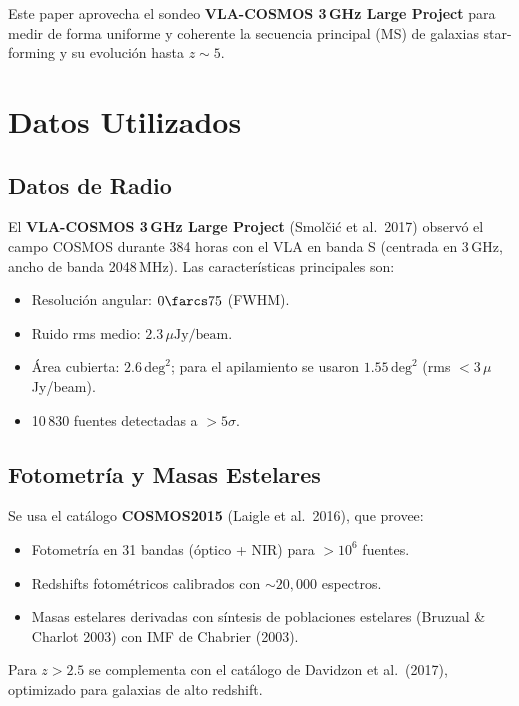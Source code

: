 \documentclass[12pt, a4paper]{article}
\begin{document}
Este paper aprovecha el sondeo \textbf{VLA-COSMOS 3\,GHz Large Project} para
medir de forma uniforme y coherente la secuencia principal (MS) de galaxias
star-forming y su evolución hasta $z \sim 5$.

\section{Datos Utilizados}

\subsection{Datos de Radio}
El \textbf{VLA-COSMOS 3\,GHz Large Project} (Smol\v{c}i\'c et al.\ 2017) observó
el campo COSMOS durante 384 horas con el VLA en banda S (centrada en 3\,GHz,
ancho de banda 2048\,MHz). Las características principales son:

\begin{itemize}[leftmargin=2em]
    \item Resolución angular: $0\farcs75$ (FWHM).
    \item Ruido rms medio: $2.3\,\mu\text{Jy/beam}$.
    \item Área cubierta: $2.6\,\text{deg}^2$; para el apilamiento se usaron
          $1.55\,\text{deg}^2$ (rms $< 3\,\mu$Jy/beam).
    \item 10\,830 fuentes detectadas a $> 5\sigma$.
\end{itemize}

\subsection{Fotometría y Masas Estelares}
Se usa el catálogo \textbf{COSMOS2015} (Laigle et al.\ 2016), que provee:

\begin{itemize}[leftmargin=2em]
    \item Fotometría en 31 bandas (óptico + NIR) para $>10^6$ fuentes.
    \item Redshifts fotométricos calibrados con $\sim20{,}000$ espectros.
    \item Masas estelares derivadas con síntesis de poblaciones estelares
          (Bruzual \& Charlot 2003) con IMF de Chabrier (2003).
\end{itemize}

Para $z > 2.5$ se complementa con el catálogo de Davidzon et al.\ (2017),
optimizado para galaxias de alto redshift.
\end{document}
